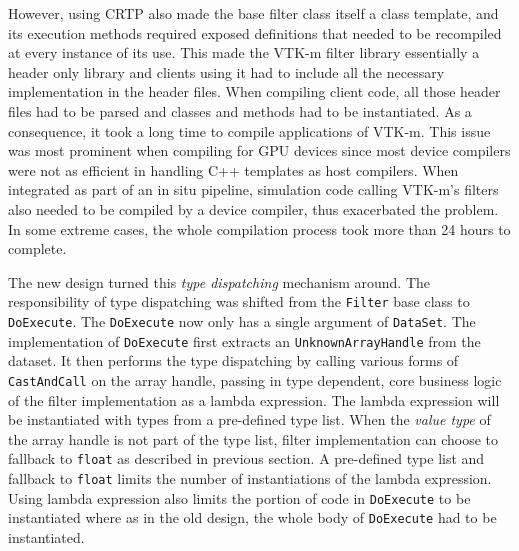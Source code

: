 
However, using CRTP also made the base filter class itself a class template, and its execution methods required exposed definitions that needed to be recompiled at every instance of its use.
This made the VTK-m filter library essentially a header only library and clients using it had to include all the necessary implementation in the header files.
When compiling client code, all those header files had to be parsed and classes and methods had to be instantiated.
As a consequence, it took a long time to compile applications of VTK-m.
This issue was most prominent when compiling for GPU devices since most device compilers were not as efficient in handling C++ templates as host compilers.
When integrated as part of an in situ pipeline, simulation code calling VTK-m's filters also needed to be compiled by a device compiler, thus exacerbated the problem.
In some extreme cases, the whole compilation process took more than 24 hours to complete.


The new design turned this \emph{type dispatching} mechanism around. The responsibility of type dispatching was shifted from the \texttt{Filter} base class to \texttt{DoExecute}. The \texttt{DoExecute} now only has a single argument of \texttt{DataSet}. The implementation of \texttt{DoExecute} first extracts an \texttt{UnknownArrayHandle} from the dataset. It then performs the type dispatching by calling various forms of \texttt{CastAndCall} on the array handle, passing in type dependent, core business logic of the filter implementation as a lambda expression. The lambda expression will be instantiated with types from a pre-defined type list. When the \emph{value type} of the array handle is not part of the type list, filter implementation can choose to fallback to \texttt{float} as described in previous section. A pre-defined type list and fallback to \texttt{float} limits the number of instantiations of the lambda expression. Using lambda expression also limits the portion of code in \texttt{DoExecute} to be instantiated where as in the old design, the whole body of \texttt{DoExecute} had to be instantiated.

